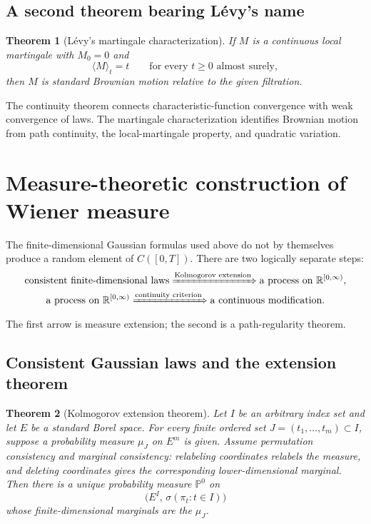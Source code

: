 \documentclass[10pt,a4paper]{article}
\numberwithin{equation}{section}
\theoremstyle{blueplain}
\newtheorem{theorem}{Theorem}[section]
\theoremstyle{definition}
\newcommand{\Pp}{\mathbb P}
\newcommand{\R}{\mathbb R}
\begin{document}
\subsection{A second theorem bearing L\'evy's name}

\begin{theorem}[L\'evy's martingale characterization]
If \(M\) is a continuous local martingale with \(M_0=0\) and
\begin{equation}
  \langle M\rangle_t=t
  \qquad\text{for every }t\ge0\text{ almost surely},
\end{equation}
then \(M\) is standard Brownian motion relative to the given filtration.
\end{theorem}

The continuity theorem connects characteristic-function convergence with weak
convergence of laws.  The martingale characterization identifies Brownian
motion from path continuity, the local-martingale property, and quadratic
variation.

\clearpage
\section{Measure-theoretic construction of Wiener measure}
\label{sec:wiener-construction}

The finite-dimensional Gaussian formulas used above do not by themselves
produce a random element of \(C([0,T])\).  There are two logically separate
steps:
\[
 \begin{gathered}
  \text{consistent finite-dimensional laws}
  \xRightarrow{\text{Kolmogorov extension}}
  \text{a process on }\R^{[0,\infty)},\\[-1mm]
  \text{a process on }\R^{[0,\infty)}
  \xRightarrow{\text{continuity criterion}}
  \text{a continuous modification}.
 \end{gathered}
\]
The first arrow is measure extension; the second is a path-regularity theorem.

\subsection{Consistent Gaussian laws and the extension theorem}

\begin{theorem}[Kolmogorov extension theorem]
Let \(I\) be an arbitrary index set and let \(E\) be a standard Borel space.
For every finite ordered set \(J=(t_1,\ldots,t_m)\subset I\), suppose a
probability measure \(\mu_J\) on \(E^m\) is given.  Assume permutation
consistency and marginal consistency: relabeling coordinates relabels the
measure, and deleting coordinates gives the corresponding lower-dimensional
marginal.  Then there is a unique probability measure \(\Pp^0\) on
\[
  \bigl(E^I,\,\sigma(\pi_t:t\in I)\bigr)
\]
whose finite-dimensional marginals are the \(\mu_J\).
\end{theorem}
\end{document}
